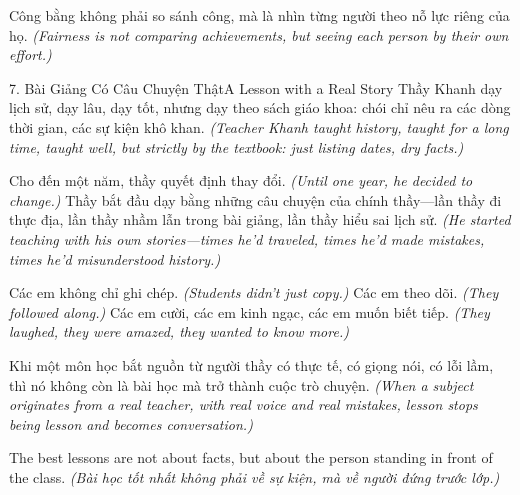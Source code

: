 \begin{baihoc}
Công bằng không phải so sánh công, mà là nhìn từng người theo nỗ lực riêng của họ.
\textit{(Fairness is not comparing achievements, but seeing each person by their own effort.)}
\end{baihoc}

\begin{truyen}{7. Bài Giảng Có Câu Chuyện Thật}{A Lesson with a Real Story}
Thầy Khanh dạy lịch sử, dạy lâu, dạy tốt, nhưng dạy theo sách giáo khoa: chói chỉ nêu ra các dòng thời gian, các sự kiện khô khan.
\textit{(Teacher Khanh taught history, taught for a long time, taught well, but strictly by the textbook: just listing dates, dry facts.)}

Cho đến một năm, thầy quyết định thay đổi.
\textit{(Until one year, he decided to change.)}
Thầy bắt đầu dạy bằng những câu chuyện của chính thầy—lần thầy đi thực địa, lần thầy nhầm lẫn trong bài giảng, lần thầy hiểu sai lịch sử.
\textit{(He started teaching with his own stories—times he'd traveled, times he'd made mistakes, times he'd misunderstood history.)}

Các em không chỉ ghi chép.
\textit{(Students didn't just copy.)}
Các em theo dõi.
\textit{(They followed along.)}
Các em cười, các em kinh ngạc, các em muốn biết tiếp.
\textit{(They laughed, they were amazed, they wanted to know more.)}

Khi một môn học bắt nguồn từ người thầy có thực tế, có giọng nói, có lỗi lầm, thì nó không còn là bài học mà trở thành cuộc trò chuyện.
\textit{(When a subject originates from a real teacher, with real voice and real mistakes, lesson stops being lesson and becomes conversation.)}
\end{truyen}

\begin{ghinhoanh}
The best lessons are not about facts, but about the person standing in front of the class.
\textit{(Bài học tốt nhất không phải về sự kiện, mà về người đứng trước lớp.)}
\end{ghinhoanh}

